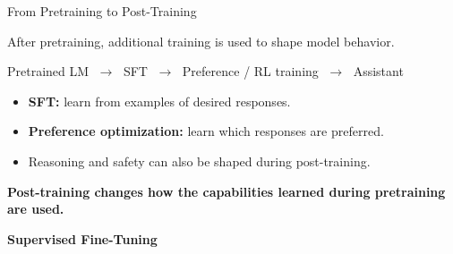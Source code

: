 \documentclass[11pt,compress,t,notes=noshow, xcolor=table]{beamer}
\begin{document}

\begin{vbframe}{From Pretraining to Post-Training}

After pretraining, additional training is used to shape model behavior.

\begin{center}
Pretrained LM
$\;\longrightarrow\;$
SFT
$\;\longrightarrow\;$
Preference / RL training
$\;\longrightarrow\;$
Assistant
\end{center}

\begin{itemize}
    \item \textbf{SFT:} learn from examples of desired responses.
    \item \textbf{Preference optimization:} learn which responses are preferred.
    \item Reasoning and safety can also be shaped during post-training.
\end{itemize}

\begin{center}
\textbf{Post-training changes how the capabilities learned during pretraining are used.}
\end{center}

\end{vbframe}





\begin{frame}[plain]

\vfill

\begin{center}
    {\LARGE \textbf{Supervised Fine-Tuning}}
\end{center}

\vfill

\end{frame}
\end{document}
